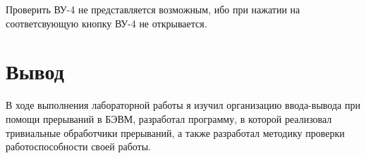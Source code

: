 Проверить ВУ-4 не представляется возможным, ибо при нажатии на соответсвующую кнопку ВУ-4 не открывается.

\section{Вывод}
В ходе выполнения лабораторной работы я изучил организацию ввода-вывода при помощи прерываний в БЭВМ, разработал программу, в которой реализовал тривиальные обработчики прерываний, а также разработал методику проверки работоспособности своей работы.
